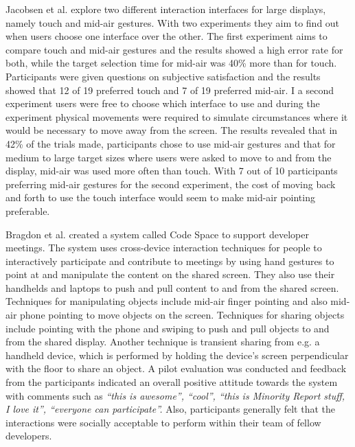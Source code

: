 Jacobsen et al. \cite{Jakobsen:2015} explore two different interaction interfaces for large displays, namely touch and mid-air gestures.
With two experiments they aim to find out when users choose one interface over the other.
The first experiment aims to compare touch and mid-air gestures and the results showed a high error rate for both, while the target selection time for mid-air was 40\% more than for touch.
Participants were given questions on subjective satisfaction and the results showed that 12 of 19 preferred touch and 7 of 19 preferred mid-air.
I a second experiment users were free to choose which interface to use and during the experiment physical movements were required to simulate circumstances where it would be necessary to move away from the screen.
The results revealed that in 42\% of the trials made, participants chose to use mid-air gestures and that for medium to large target sizes where users were asked to move to and from the display, mid-air was used more often than touch.
With 7 out of 10 participants preferring mid-air gestures for the second experiment, the cost of moving back and forth to use the touch interface would seem to make mid-air pointing preferable.

Bragdon et al. \cite{Bragdon:2011} created a system called Code Space to support developer meetings.
The system uses cross-device interaction techniques for people to interactively participate and contribute to meetings by using hand gestures to point at and manipulate the content on the shared screen.
They also use their handhelds and laptops to push and pull content to and from the shared screen.
Techniques for manipulating objects include mid-air finger pointing and also mid-air phone pointing to move objects on the screen.
Techniques for sharing objects include pointing with the phone and swiping to push and pull objects to and from the shared display.
Another technique is transient sharing from e.g. a handheld device, which is performed by holding the device's screen perpendicular with the floor to share an object.
A pilot evaluation was conducted and feedback from the participants indicated an overall positive attitude towards the system with comments such as \textit{``this is awesome'', ``cool'', ``this is Minority Report stuff, I love it'', ``everyone can participate''.}
Also, participants generally felt that the interactions were socially acceptable to perform within their team of fellow developers.

